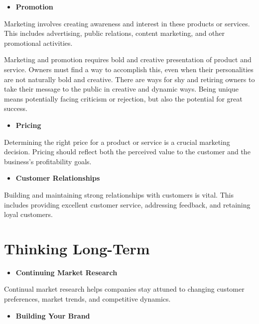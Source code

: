\documentclass[
]{book}
\providecommand{\tightlist}{%
  \setlength{\itemsep}{0pt}\setlength{\parskip}{0pt}}
\begin{document}
\begin{itemize}
\tightlist
\item
  \textbf{Promotion}
\end{itemize}

Marketing involves creating awareness and interest in these products or services. This includes advertising, public relations, content marketing, and other promotional activities.

Marketing and promotion requires bold and creative presentation of product and service. Owners must find a way to accomplish this, even when their personalities are not naturally bold and creative. There are ways for shy and retiring owners to take their message to the public in creative and dynamic ways. Being unique means potentially facing criticism or rejection, but also the potential for great success.

\begin{itemize}
\tightlist
\item
  \textbf{Pricing}
\end{itemize}

Determining the right price for a product or service is a crucial marketing decision. Pricing should reflect both the perceived value to the customer and the business's profitability goals.

\begin{itemize}
\tightlist
\item
  \textbf{Customer Relationships}
\end{itemize}

Building and maintaining strong relationships with customers is vital. This includes providing excellent customer service, addressing feedback, and retaining loyal customers.

\hypertarget{thinking-long-term}{%
\section{\texorpdfstring{\textbf{Thinking Long-Term}}{Thinking Long-Term}}\label{thinking-long-term}}

\begin{itemize}
\tightlist
\item
  \textbf{Continuing Market Research}
\end{itemize}

Continual market research helps companies stay attuned to changing customer preferences, market trends, and competitive dynamics.

\begin{itemize}
\tightlist
\item
  \textbf{Building Your Brand}
\end{itemize}
\end{document}
